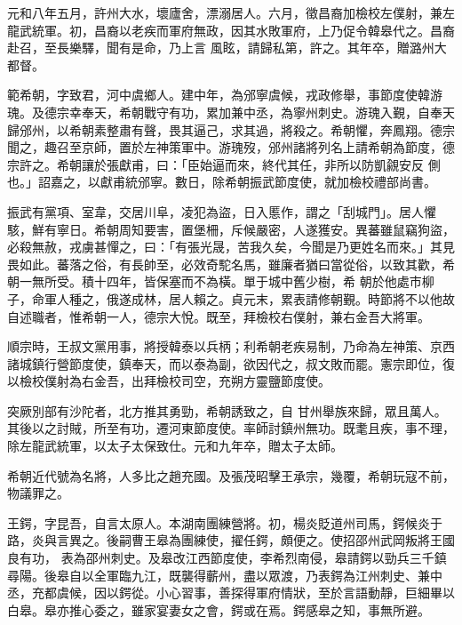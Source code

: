 \begin{pinyinscope}
 元和八年五月，許州大水，壞廬舍，漂溺居人。六月，徵昌裔加檢校左僕射，兼左龍武統軍。初，昌裔以老疾而軍府無政，因其水敗軍府，上乃促令韓皋代之。昌裔赴召，至長樂驛，聞有是命，乃上言
 風眩，請歸私第，許之。其年卒，贈潞州大都督。



 範希朝，字致君，河中虞鄉人。建中年，為邠寧虞候，戎政修舉，事節度使韓游瑰。及德宗幸奉天，希朝戰守有功，累加兼中丞，為寧州刺史。游瑰入覲，自奉天歸邠州，以希朝素整肅有聲，畏其逼己，求其過，將殺之。希朝懼，奔鳳翔。德宗聞之，趣召至京師，置於左神策軍中。游瑰歿，邠州諸將列名上請希朝為節度，德宗許之。希朝讓於張獻甫，曰：「臣始逼而來，終代其任，非所以防凱覦安反
 側也。」詔嘉之，以獻甫統邠寧。數日，除希朝振武節度使，就加檢校禮部尚書。



 振武有黨項、室韋，交居川阜，凌犯為盜，日入慝作，謂之「刮城門」。居人懼駭，鮮有寧日。希朝周知要害，置堡柵，斥候嚴密，人遂獲安。異蕃雖鼠竊狗盜，必殺無赦，戎虜甚憚之，曰：「有張光晟，苦我久矣，今聞是乃更姓名而來。」其見畏如此。蕃落之俗，有長帥至，必效奇駝名馬，雖廉者猶曰當從俗，以致其歡，希朝一無所受。積十四年，皆保塞而不為橫。單于城中舊少樹，希
 朝於他處市柳子，命軍人種之，俄遂成林，居人賴之。貞元末，累表請修朝覲。時節將不以他故自述職者，惟希朝一人，德宗大悅。既至，拜檢校右僕射，兼右金吾大將軍。



 順宗時，王叔文黨用事，將授韓泰以兵柄；利希朝老疾易制，乃命為左神策、京西諸城鎮行營節度使，鎮奉天，而以泰為副，欲因代之，叔文敗而罷。憲宗即位，復以檢校僕射為右金吾，出拜檢校司空，充朔方靈鹽節度使。



 突厥別部有沙陀者，北方推其勇勁，希朝誘致之，自
 甘州舉族來歸，眾且萬人。其後以之討賊，所至有功，遷河東節度使。率師討鎮州無功。既耄且疾，事不理，除左龍武統軍，以太子太保致仕。元和九年卒，贈太子太師。



 希朝近代號為名將，人多比之趙充國。及張茂昭擊王承宗，幾覆，希朝玩寇不前，物議罪之。



 王鍔，字昆吾，自言太原人。本湖南團練營將。初，楊炎貶道州司馬，鍔候炎于路，炎與言異之。後嗣曹王皋為團練使，擢任鍔，頗便之。使招邵州武岡叛將王國良有功，
 表為邵州刺史。及皋改江西節度使，李希烈南侵，皋請鍔以勁兵三千鎮尋陽。後皋自以全軍臨九江，既襲得蘄州，盡以眾渡，乃表鍔為江州刺史、兼中丞，充都虞候，因以鍔從。小心習事，善探得軍府情狀，至於言語動靜，巨細畢以白皋。皋亦推心委之，雖家宴妻女之會，鍔或在焉。鍔感皋之知，事無所避。




\end{pinyinscope}
